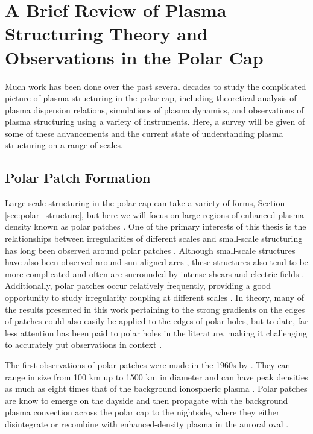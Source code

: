\section{A Brief Review of Plasma Structuring Theory and Observations in the Polar Cap}
Much work has been done over the past several decades to study the complicated picture of plasma structuring in the polar cap, including theoretical analysis of plasma dispersion relations, simulations of plasma dynamics, and observations of plasma structuring using a variety of instruments.  Here, a survey will be given of some of these advancements and the current state of understanding plasma structuring on a range of scales.

\subsection{Polar Patch Formation}
\label{sec:lit_patches}
Large-scale structuring in the polar cap can take a variety of forms, Section \ref{sec:polar_structure}, but here we will focus on large regions of enhanced plasma density known as polar patches  \citep[e.g.][]{Weber1984,Weber1986,Buchau1983,Buchau1985}.  One of the primary interests of this thesis is the relationships between irregularities of different scales and small-scale structuring has long been observed around polar patches \citep{Weber1984,Milan2002b,Moen2012}.  Although small-scale structures have also been observed around sun-aligned arcs \citep[e.g.][]{Koustov2012}, these structures also tend to be more complicated and often are surrounded by intense shears and electric fields \citep{Safargaleev2000,Aikio2002,Kozlovsky2007}.  Additionally, polar patches occur relatively frequently, providing a good opportunity to study irregularity coupling at different scales \citep{Rodger1996}.  In theory, many of the results presented in this work pertaining to the strong gradients on the edges of patches could also easily be applied to the edges of polar holes, but to date, far less attention has been paid to polar holes in the literature, making it challenging to accurately put observations in context \citep{Makarevich2015}.

The first observations of polar patches were made in the 1960s by \citet{Hill1963}.  They can range in size from 100 km up to 1500 km in diameter and can have peak densities as much as eight times that of the background ionospheric plasma \citep{Weber1986,Hosokawa2014}.  Polar patches are know to emerge on the dayside and then propagate with the background plasma convection across the polar cap to the nightside, where they either disintegrate or recombine with enhanced-density plasma in the auroral oval \citep{Weber1985,Weber1986}.

